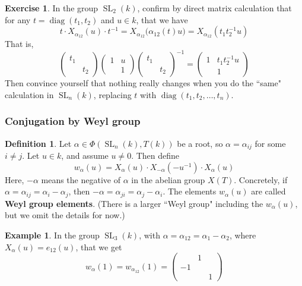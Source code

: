 \documentclass[12pt]{article}
\theoremstyle{definition}
\newtheorem{definition}[theorem]{Definition}
\newtheorem{example}[theorem]{Example}
\newtheorem{exercise}[theorem]{Exercise}
\newcommand{\tbf}{\textbf}
\newcommand{\inv}{^{-1}}
\DeclareMathOperator{\SL}{SL}
\DeclareMathOperator{\diag}{diag}
\begin{document}
\begin{exercise}
In the group $\SL_2(k)$, confirm by direct matrix calculation that for any $t = \diag(t_1, t_2)$ and $u \in k$, that we have
\[
	t \cdot X_{\alpha_{12}}(u) \cdot t \inv = X_{\alpha_{12}} \Big( \alpha_{12}(t) u \Big) = X_{\alpha_{12}} ( t_1 t_2 \inv u )
\]
That is,
\[
	\begin{pmatrix}
		t_1 \\
		& t_2
	\end{pmatrix}
	\begin{pmatrix}
		1 & u \\
		& 1
	\end{pmatrix}
	\begin{pmatrix}
		t_1 \\
		& t_2
	\end{pmatrix} \inv
	=
	\begin{pmatrix}
		1 & t_1 t_2 \inv u  \\
		& 1
	\end{pmatrix}
\]
Then convince yourself that nothing really changes when you do the ``same" calculation in $\SL_n(k)$, replacing $t$ with $\diag(t_1, t_2, \ldots, t_n)$.
\end{exercise}


\subsubsection{Conjugation by Weyl group}

\begin{definition}
Let $\alpha \in \Phi(\SL_n(k), T(k))$ be a root, so $\alpha = \alpha_{ij}$ for some $i \neq j$. Let $u \in k$, and assume $u \neq 0$. Then define
\[
	w_\alpha(u) = X_\alpha(u) \cdot X_{-\alpha}( -u \inv) \cdot X_\alpha(u)
\]
Here, $-\alpha$ means the negative of $\alpha$ in the abelian group $X(T)$. Concretely, if $\alpha = \alpha_{ij} = \alpha_i - \alpha_j$, then $- \alpha = \alpha_{ji} = \alpha_j - \alpha_i$. The elements $w_\alpha(u)$ are called \tbf{Weyl group elements}. (There is a larger ``Weyl group" including the $w_\alpha(u)$, but we omit the details for now.)
\end{definition}

\begin{example}
In the group $\SL_3(k)$, with $\alpha = \alpha_{12} = \alpha_1 - \alpha_2$, where $X_\alpha(u) = e_{12}(u)$, that we get
\[
	w_\alpha(1) = w_{\alpha_{12}}(1) =
	\begin{pmatrix}
		& 1 \\
		-1 \\
		&& 1
	\end{pmatrix}
\]
\end{example}
\end{document}
